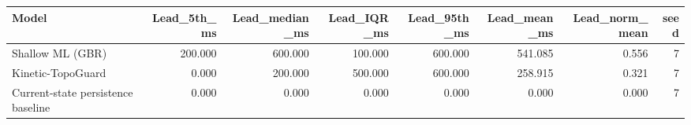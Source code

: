 \begin{tabular}{lrrrrrrr}
\toprule
Model & Lead\_5th\_ms & Lead\_median\_ms & Lead\_IQR\_ms & Lead\_95th\_ms & Lead\_mean\_ms & Lead\_norm\_mean & seed \\
\midrule
Shallow ML (GBR) & 200.000 & 600.000 & 100.000 & 600.000 & 541.085 & 0.556 & 7 \\
Kinetic-TopoGuard & 0.000 & 200.000 & 500.000 & 600.000 & 258.915 & 0.321 & 7 \\
Current-state persistence baseline & 0.000 & 0.000 & 0.000 & 0.000 & 0.000 & 0.000 & 7 \\
\bottomrule
\end{tabular}